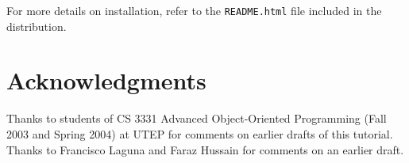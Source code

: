 \documentclass[twocolumn]{article}
\begin{document}
For more details on installation, refer to the \texttt{README.html}
file included in the distribution.

\section*{Acknowledgments}

Thanks to students of CS 3331 Advanced Object-Oriented Programming
(Fall 2003 and Spring 2004) at UTEP for comments on earlier drafts of
this tutorial.  Thanks to Francisco Laguna and Faraz Hussain
for comments on an earlier draft.



\end{document}
